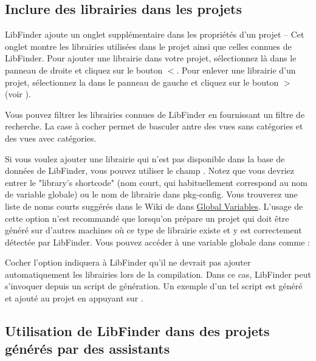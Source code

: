 \subsection{Inclure des librairies dans les projets}

LibFinder ajoute un onglet supplémentaire dans les propriétés d'un projet  -- Cet onglet montre les librairies utilisées dans le projet ainsi que celles connues de LibFinder. Pour ajouter une librairie dans votre projet, sélectionnez là dans le panneau de droite et cliquez sur le bouton $<$. Pour enlever une librairie d'un projet, sélectionnez la dans le panneau de gauche et cliquez sur le bouton $>$ (voir ).


Vous pouvez filtrer les librairies connues de LibFinder en fournissant un filtre de recherche. La case à cocher   permet de basculer antre des vues sans catégories et des vues avec catégories.

Si vous voulez ajouter une librairie qui n'est pas disponible dans la base de données de LibFinder, vous pouvez utiliser le champ . Notez que vous devriez entrer le "library's shortcode" (nom court, qui habituellement correspond au nom de variable globale) ou le nom de librairie dans pkg-config. Vous trouverez une liste de noms courts suggérés dans le Wiki de \codeblocks dans \href{http://wiki.codeblocks.org/index.php?title=Recommended_global_variables}{Global Variables}. L'usage de cette option n'est recommandé que lorsqu'on prépare un projet qui doit être généré sur d'autres machines où ce type de librairie existe et y est correctement détectée par LibFinder. Vous pouvez accéder à une variable globale dans \codeblocks comme :


Cocher l'option  indiquera à LibFinder qu'il ne devrait pas ajouter automatiquement les librairies lors de la compilation. Dans ce cas, LibFinder peut s'invoquer depuis un script de génération. Un exemple d'un tel script est généré et ajouté au projet en appuyant sur  .

\subsection{Utilisation de LibFinder dans des projets générés par des assistants}

